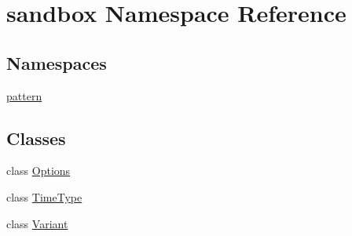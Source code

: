 \hypertarget{namespacesandbox}{\section{sandbox Namespace Reference}
\label{namespacesandbox}
}
\subsection*{Namespaces}
\begin{DoxyCompactItemize}
\item 
\hyperlink{namespacesandbox_1_1pattern}{pattern}
\end{DoxyCompactItemize}
\subsection*{Classes}
\begin{DoxyCompactItemize}
\item 
class \hyperlink{classsandbox_1_1_options}{Options}
\item 
class \hyperlink{classsandbox_1_1_time_type}{Time\-Type}
\item 
class \hyperlink{classsandbox_1_1_variant}{Variant}
\end{DoxyCompactItemize}
